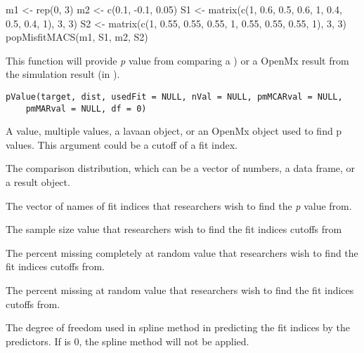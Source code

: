 \documentclass[a4paper]{book}
\begin{document}
%
\begin{Examples}
\begin{ExampleCode}
m1 <- rep(0, 3)
m2 <- c(0.1, -0.1, 0.05)
S1 <- matrix(c(1, 0.6, 0.5, 0.6, 1, 0.4, 0.5, 0.4, 1), 3, 3)
S2 <- matrix(c(1, 0.55, 0.55, 0.55, 1, 0.55, 0.55, 0.55, 1), 3, 3)
popMisfitMACS(m1, S1, m2, S2)
\end{ExampleCode}
\end{Examples}
%
\begin{Description}\relax
This function will provide \emph{p} value from comparing a ) or a OpenMx result from the simulation result (in ).
\end{Description}
%
\begin{Usage}
\begin{verbatim}
pValue(target, dist, usedFit = NULL, nVal = NULL, pmMCARval = NULL, 
	pmMARval = NULL, df = 0)
\end{verbatim}
\end{Usage}
%
\begin{Arguments}
\begin{ldescription}
\item[\code{target}] 
A value, multiple values, a lavaan object, or an OpenMx object used to find p values. This argument could be a cutoff of a fit index.

\item[\code{dist}] 
The comparison distribution, which can be a vector of numbers, a data frame, or a result object.

\item[\code{usedFit}] 
The vector of names of fit indices that researchers wish to find the \emph{p} value from.

\item[\code{nVal}] 
The sample size value that researchers wish to find the fit indices cutoffs from

\item[\code{pmMCARval}] 
The percent missing completely at random value that researchers wish to find the fit indices cutoffs from.

\item[\code{pmMARval}] 
The percent missing at random value that researchers wish to find the fit indices cutoffs from.

\item[\code{df}] 
The degree of freedom used in spline method in predicting the fit indices by the predictors. If  is 0, the spline method will not be applied.

\end{ldescription}
\end{Arguments}
\end{document}

